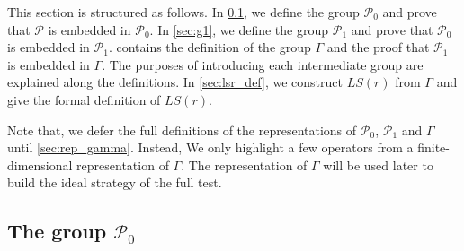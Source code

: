 \documentclass[11pt,letterpaper]{article}
\newcommand{\1}{\mathbb{1}}
\newcommand{\Pg}{\mathcal{P}}
\newcommand{\LS}{LS}
\theoremstyle{definition}
\begin{document}
This section is structured as follows.
In \cref{sec:g0}, we define the group $\Pg_0$ and prove that $\Pg$ is embedded in $\Pg_0$.
In \cref{sec:g1}, we define the group $\Pg_1$ and prove that $\Pg_0$ is embedded in $\Pg_1$.
 contains the definition of the group $\Gamma$ and the proof that $\Pg_1$
is embedded in $\Gamma$.
The purposes of introducing each intermediate
group are explained along the definitions.
In \cref{sec:lsr_def}, we construct $\LS(r)$ from $\Gamma$ and give the 
formal definition of $\LS( r )$.

Note that, we defer the full definitions of the representations of $\Pg_0$, $\Pg_1$ and $\Gamma$
until \cref{sec:rep_gamma}. 
Instead, We only highlight a few operators from a finite-dimensional representation of $\Gamma$.
The representation of $\Gamma$ will be used later to build the ideal strategy of the full test.

\subsection{The group $\Pg_0$}
\label{sec:g0}
\end{document}
